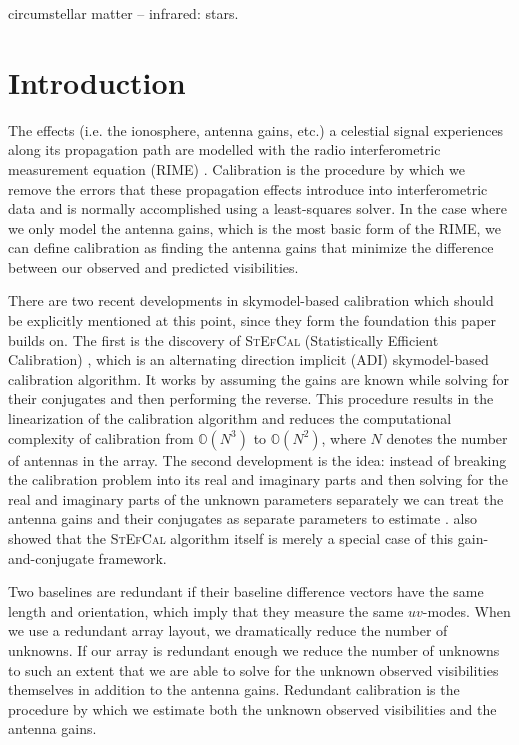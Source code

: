 \documentclass[useAMS,usenatbib]{mn2e}
\begin{document}
\begin{keywords}
circumstellar matter -- infrared: stars.
\end{keywords}

\section{Introduction}
The effects (i.e. the ionosphere, antenna gains, etc.) a celestial signal experiences along its propagation path are modelled with the radio interferometric measurement equation (RIME) \citep{ME1,RRIME1}.
Calibration is the procedure by which we remove the errors that these propagation effects introduce into interferometric data and is normally accomplished using a 
least-squares solver. In the case where we only model the antenna gains, which is the most basic form of the RIME, we can define calibration as finding the antenna gains that minimize the difference between our observed and predicted visibilities. 

There are two recent developments in skymodel-based calibration which should be explicitly mentioned at this point, since they form the foundation this paper builds on. The first is the discovery of \textsc{StEfCal} (Statistically Efficient Calibration) \citep{Mitchell:MWA-cal,Salvini2014}, which 
is an alternating direction implicit (ADI) skymodel-based calibration algorithm. It works by assuming the gains are known while solving for their conjugates and then performing the reverse. 
This procedure results in the linearization of the calibration algorithm and reduces the computational complexity of calibration from $\mathbb{O}(N^3)$ to $\mathbb{O}(N^2)$, where $N$ denotes the number of antennas in the array. 
The second development is the idea: instead of breaking the calibration problem 
into its real and imaginary parts and then solving for the real and imaginary parts of the unknown parameters separately we can treat the antenna gains and their 
conjugates as separate parameters to estimate \citep{Smirnov2015}. \citet{Smirnov2015} also showed that the \textsc{StEfCal} algorithm itself is merely a special case of this
gain-and-conjugate framework. 

Two baselines are redundant if their baseline difference vectors have the same length and orientation, which imply that they measure the same $uv$-modes. When we use a redundant array layout, we dramatically 
reduce the number of unknowns. If our array is redundant enough we reduce the number of unknowns to such an extent that we are able to solve for the unknown 
observed visibilities themselves in addition to the antenna gains. Redundant calibration is the procedure by which we estimate both the unknown observed visibilities and the antenna gains.
\end{document}

